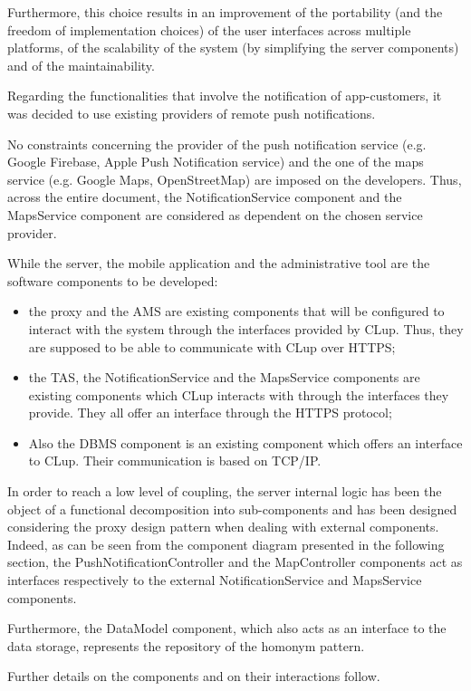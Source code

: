 \documentclass[a4paper,oneside,11pt]{book}
\begin{document}
    Furthermore, this choice results in an improvement of the portability (and the freedom of implementation choices) of the user interfaces across multiple platforms, of the scalability of the system (by simplifying the server components) and of the maintainability. \par
    Regarding the functionalities that involve the notification of app-customers, it was decided to use existing providers of remote push notifications. \par
    No constraints concerning the provider of the push notification service (e.g. Google Firebase, Apple Push Notification service) and the one of the maps service (e.g. Google Maps, OpenStreetMap) are imposed on the developers. Thus, across the entire document, the NotificationService component and the MapsService component are considered as dependent on the chosen service provider. \par
    While the server, the mobile application and the administrative tool are the software components to be developed:
    \begin{itemize}
        \item the proxy and the AMS are existing components that will be configured to interact with the system through the interfaces provided by CLup. Thus, they are supposed to be able to communicate with CLup over HTTPS;
        \item the TAS, the NotificationService and the MapsService components are existing components which CLup interacts with through the interfaces they provide. They all offer an interface through the HTTPS protocol;
        \item Also the DBMS component is an existing component which offers an interface to CLup. Their communication is based on TCP/IP.
    \end{itemize}
    In order to reach a low level of coupling, the server internal logic has been the object of a functional decomposition into sub-components and has been designed considering the proxy design pattern when dealing with external components. Indeed, as can be seen from the component diagram presented in the following section, the PushNotificationController and the MapController components act as interfaces respectively to the external NotificationService and MapsService components.
 \par
    Furthermore, the DataModel component, which also acts as an interface to the data storage, represents the repository of the homonym pattern. \par
    Further details on the components and on their interactions follow.
    
\end{document}
